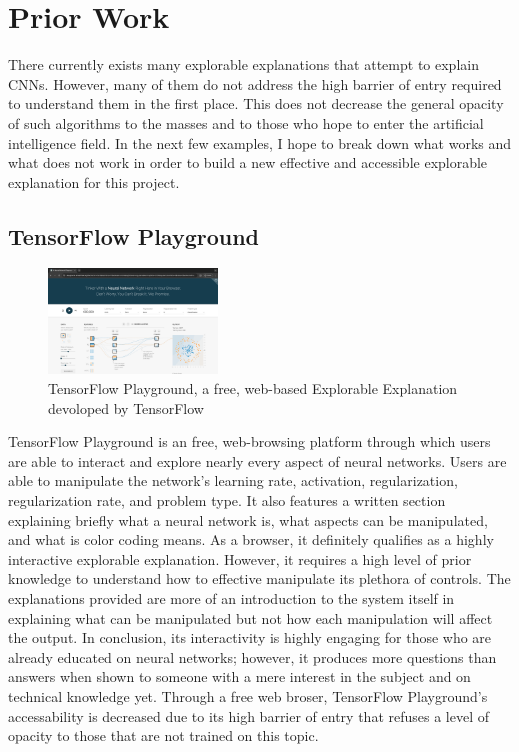 \documentclass[10pt,twocolumn]{article}
\begin{document}
\section{Prior Work}
There currently exists many explorable explanations that attempt to explain CNNs. However, many of them do not address the high barrier of entry required to understand them in the first place. This does not decrease the general opacity of such algorithms to the masses and to those who hope to enter the artificial intelligence field. In the next few examples, I hope to break down what works and what does not work in order to build a new effective and accessible explorable explanation for this project. 

\subsection{TensorFlow Playground}
\begin{figure}[h]
\caption{TensorFlow Playground, a free, web-based Explorable Explanation devoloped by TensorFlow}
\centering
\includegraphics[width=0.4\textwidth]{./Images/tFPlayground.png}
\end{figure}
TensorFlow Playground is an free, web-browsing platform through which users are able to interact and explore nearly every aspect of neural networks. Users are able to manipulate the network's learning rate, activation, regularization, regularization rate, and problem type. It also features a written section explaining briefly what a neural network is, what aspects can be manipulated, and what is color coding means. As a browser, it definitely qualifies as a highly interactive explorable explanation. However, it requires a high level of prior knowledge to understand how to effective manipulate its plethora of controls. The explanations provided are more of an introduction to the system itself in explaining what can be manipulated but not how each manipulation will affect the output. In conclusion, its interactivity is highly engaging for those who are already educated on neural networks; however, it produces more questions than answers when shown to someone with a mere interest in the subject and on technical knowledge yet. Through a free web broser, TensorFlow Playground's accessability is decreased due to its high barrier of entry that refuses a level of opacity to those that are not trained on this topic. \cite{tensorflow2015-whitepaper}
\end{document}
